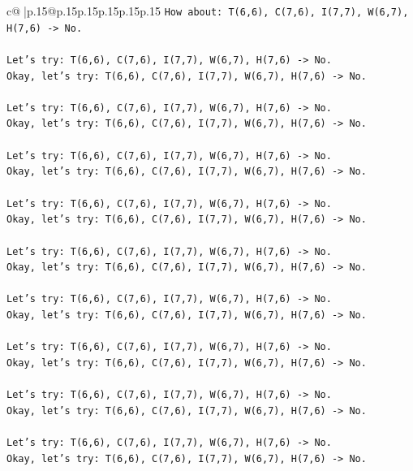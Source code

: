 \documentclass{article}
\begin{document}
{\begin{supertabular}{c@{$\;$}|p{.15\linewidth}@{}p{.15\linewidth}p{.15\linewidth}p{.15\linewidth}p{.15\linewidth}p{.15\linewidth}}
{{{\texttt{How about: T(6,6), C(7,6), I(7,7), W(6,7), H(7,6) {-}> No.} \\
\\ 
\texttt{Let's try: T(6,6), C(7,6), I(7,7), W(6,7), H(7,6) {-}> No.} \\
\texttt{Okay, let's try: T(6,6), C(7,6), I(7,7), W(6,7), H(7,6) {-}> No.} \\
\\ 
\texttt{Let's try: T(6,6), C(7,6), I(7,7), W(6,7), H(7,6) {-}> No.} \\
\texttt{Okay, let's try: T(6,6), C(7,6), I(7,7), W(6,7), H(7,6) {-}> No.} \\
\\ 
\texttt{Let's try: T(6,6), C(7,6), I(7,7), W(6,7), H(7,6) {-}> No.} \\
\texttt{Okay, let's try: T(6,6), C(7,6), I(7,7), W(6,7), H(7,6) {-}> No.} \\
\\ 
\texttt{Let's try: T(6,6), C(7,6), I(7,7), W(6,7), H(7,6) {-}> No.} \\
\texttt{Okay, let's try: T(6,6), C(7,6), I(7,7), W(6,7), H(7,6) {-}> No.} \\
\\ 
\texttt{Let's try: T(6,6), C(7,6), I(7,7), W(6,7), H(7,6) {-}> No.} \\
\texttt{Okay, let's try: T(6,6), C(7,6), I(7,7), W(6,7), H(7,6) {-}> No.} \\
\\ 
\texttt{Let's try: T(6,6), C(7,6), I(7,7), W(6,7), H(7,6) {-}> No.} \\
\texttt{Okay, let's try: T(6,6), C(7,6), I(7,7), W(6,7), H(7,6) {-}> No.} \\
\\ 
\texttt{Let's try: T(6,6), C(7,6), I(7,7), W(6,7), H(7,6) {-}> No.} \\
\texttt{Okay, let's try: T(6,6), C(7,6), I(7,7), W(6,7), H(7,6) {-}> No.} \\
\\ 
\texttt{Let's try: T(6,6), C(7,6), I(7,7), W(6,7), H(7,6) {-}> No.} \\
\texttt{Okay, let's try: T(6,6), C(7,6), I(7,7), W(6,7), H(7,6) {-}> No.} \\
\\ 
\texttt{Let's try: T(6,6), C(7,6), I(7,7), W(6,7), H(7,6) {-}> No.} \\
\texttt{Okay, let's try: T(6,6), C(7,6), I(7,7), W(6,7), H(7,6) {-}> No.} \\
\\ 
}}}
\end{supertabular}}
\end{document}
